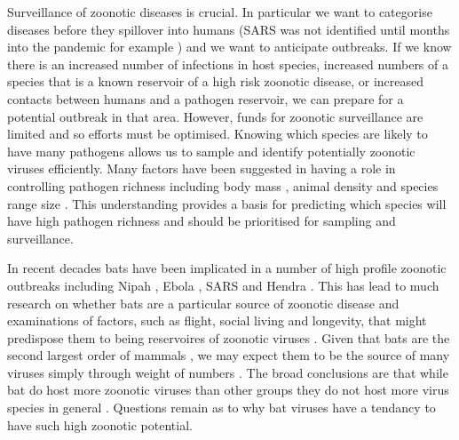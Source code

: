 
Surveillance of zoonotic diseases is crucial.
In particular we want to categorise diseases before they spillover into humans (SARS was not identified until months into the pandemic for example \cite{drosten2003identification}) and we want to anticipate outbreaks. 
If we know there is an increased number of infections in host species, increased numbers of a species that is a known reservoir of a high risk zoonotic disease, or increased contacts between humans and a pathogen reservoir, we can prepare for a potential outbreak in that area.
However, funds for zoonotic surveillance are limited and so efforts must be optimised.
Knowing which species are likely to have many pathogens allows us to sample and identify potentially zoonotic viruses efficiently.
Many factors have been suggested in having a role in controlling pathogen richness including body mass \cite{kamiya2014determines, arneberg2002host, poulin1995phylogeny}, animal density \cite{kamiya2014determines, nunn2003comparative, arneberg2002host} and species range size \cite{kamiya2014determines, nunn2003comparative}.
This understanding provides a basis for predicting which species will have high pathogen richness and should be prioritised for sampling and surveillance.





In recent decades bats have been implicated in a number of high profile zoonotic outbreaks including Nipah \cite{field2001natural}, Ebola \cite{leroy2005fruit}, SARS \cite{li2005bats} and Hendra \cite{field2001natural}.
This has lead to much research on whether bats are a particular source of zoonotic disease \cite{luis2013comparison, olival2015bats, wang2011mass} and examinations of factors, such as flight, social living and longevity, that might predispose them to being reservoires of zoonotic viruses \cite{calisher2006bats, o2014bat, dobson2005links}.
Given that bats are the second largest order of mammals \cite{wilson2005mammal}, we may expect them to be the source of many viruses simply through weight of numbers \cite{luis2013comparison}.
The broad conclusions are that while bat do host more zoonotic viruses than other groups \cite{luis2013comparison} they do not host more virus species in general \cite{olival2015bats}.
Questions remain as to why bat viruses have a tendancy to have such high zoonotic potential.





